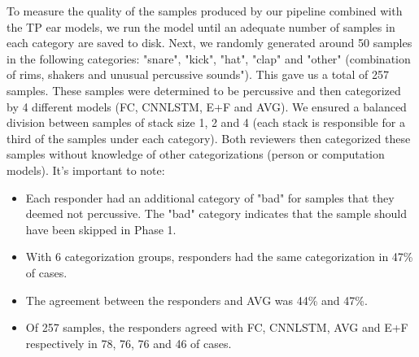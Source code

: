 \documentclass[\main/thesis.tex]{subfiles}
\begin{document}
\begin{table}[htbp]
\caption{\label{kappa_table}Table of Fleiss' kappa coefficient to measure the degree of agreement between persons (HvH), persons with FC model (H+FC), persons with CNNLSTM model, persons with all models (H+ALL), and the 3 models }
\end{table}
To measure the quality of the samples produced by our pipeline combined with the TP ear models, we run the model until an adequate number of samples in each category are saved to disk. Next, we randomly generated around 50 samples in the following categories: "snare", "kick", "hat", "clap" and "other" (combination of rims, 
shakers and unusual percussive sounds"). This gave us a total of 257 samples. These samples were determined to be percussive and then categorized by 4 different models (FC, CNNLSTM, E+F and AVG). We ensured a balanced division between samples of stack size 1, 2 and 4 (each stack is responsible for a third of the samples under each category). Both reviewers then categorized these samples without knowledge of other categorizations (person or computation models). It's important to note:
\begin{itemize}
    \item Each responder had an additional category of "bad" for samples that they deemed not percussive. The "bad" category indicates that the sample should have been skipped in Phase 1. 
    \item With 6 categorization groups, responders had the same categorization in 47\% of cases.
    \item The agreement between the responders and AVG was 44\% and 47\%.
    \item Of 257 samples, the responders agreed with FC, CNNLSTM, AVG and E+F respectively in 78, 76, 76 and 46 of cases.
\end{itemize}
\end{document}
